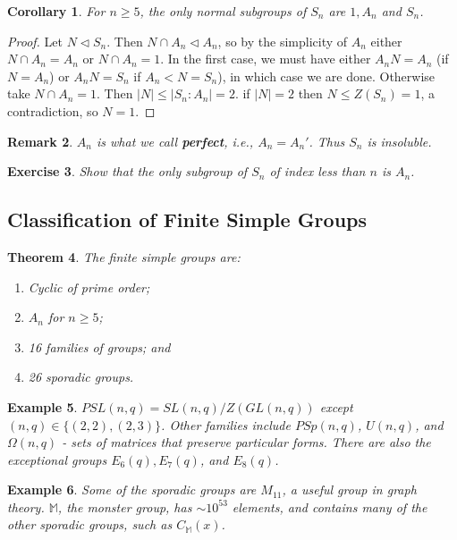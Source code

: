 \documentclass[a4paper,10pt]{article}
\newtheorem{thm}{Theorem}
\newtheorem{Cor}[thm]{Corollary}
\newtheorem{eg}[thm]{Example}
\newtheorem{Ex}[thm]{Exercise}
\newtheorem{rem}[thm]{Remark}
\begin{document}
\begin{Cor}
For $n \geq 5$, the only normal subgroups of $S_n$ are $1, A_n$ and $S_n$. 
\end{Cor}
\begin{proof}
Let $N \triangleleft S_n$. Then $N \cap A_n \triangleleft A_n$, so by the simplicity of $A_n$ either $N \cap A_n = A_n$ or $N \cap A_n = 1$. In the first case, we must have either $A_n N = A_n$ (if $N = A_n$) or $A_n N = S_n$ if $A_n < N = S_n$), in which case we are done. Otherwise take $N \cap A_n = 1$. Then $|N| \leq |S_n : A_n| = 2$. if $|N| = 2$ then $N \leq Z(S_n) = 1$, a contradiction, so $N = 1$. 
\end{proof}


\begin{rem}
$A_n$ is what we call \textbf{perfect}, i.e., $A_n = A_n'$. Thus $S_n$ is insoluble.
\end{rem}

\begin{Ex}
Show that the only subgroup of $S_n$ of index less than $n$ is $A_n$.
\end{Ex}

\subsection{Classification of Finite Simple Groups}

\begin{thm}
The finite simple groups are:
\begin{enumerate}
\item Cyclic of prime order;
\item $A_n$ for $n \geq 5$; 
\item 16 families of groups; and
\item 26 sporadic groups.
\end{enumerate}
\end{thm}

\begin{eg}
$PSL(n,q) = SL(n,q) / Z(GL(n,q))$ except $(n,q) \in  \{(2,2), (2,3)\}$. Other families include $PSp(n,q)$, $U(n,q)$, and $\Omega(n,q)$ - sets of matrices that preserve particular forms. There are also the exceptional groups $E_6(q), E_7(q)$, and $E_8(q)$. 
\end{eg}

\begin{eg}
Some of the sporadic groups are $M_{11}$, a useful group in graph theory. $\mathbb{M}$, the monster group, has $\sim 10^{53}$ elements, and contains many of the other sporadic groups, such as $C_\mathbb{M}(x)$. 
\end{eg}
\end{document}
